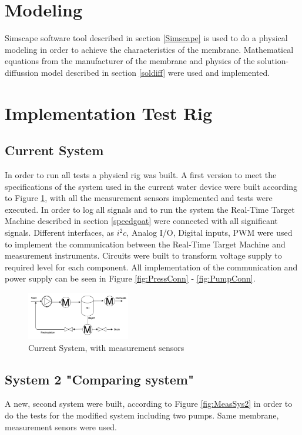 \section{Modeling}
Simscape software tool described in section \ref{Simscape} is used to do a physical modeling in order to achieve the characteristics of the membrane. Mathematical equations from the manufacturer of the membrane and physics of the solution-diffussion model described in section \ref{soldiff} were used and implemented.

\section{Implementation Test Rig}
\subsection{Current System}
In order to run all tests a physical rig was built. A first version to meet the specifications of the system used in the current water device were built according to Figure \ref{fig:MeasCurrSys}, with all the measurement sensors implemented and tests were executed.
In order to log all signals and to run the system the Real-Time Target Machine described in section \ref{speedgoat} were connected with all significant signals.
Different interfaces, as $i^{2}c$, Analog I/O, Digital inputs, PWM were used to implement the communication between the Real-Time Target Machine and measurement instruments. Circuits were built to transform voltage supply to required level for each component. All implementation of the communication and power supply can be seen in Figure \ref{fig:PressConn} - \ref{fig:PumpConn}.

\begin{figure}[h]
    \centering
    \includegraphics[width=0.4\textwidth]{MeasCurrSys}
    \caption{Current System, with measurement sensors}
    \label{fig:MeasCurrSys}
\end{figure}

\subsection{System 2  "Comparing system"}
A new, second system were built, according to Figure \ref{fig:MeasSys2} in order to do the tests for the modified system including two pumps. Same membrane, measurement senors were used.

